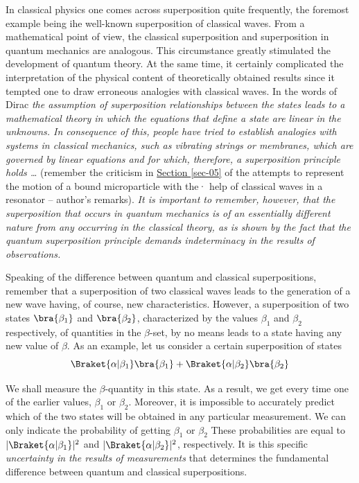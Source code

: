 \documentclass[a4paper,sfsidenotes,colorlinks=true]{tufte-book}
\numberwithin{equation}{section}
\numberwithin{figure}{section}
\begin{document}
  In  classical physics one comes across superposition quite
  frequently, the foremost example being ihe well-known superposition
  of classical waves. From a mathematical point of view, the classical
  superposition and superposition in quantum mechanics are
  analogous. This circumstance greatly stimulated the development of
  quantum theory. At the same time, it certainly complicated the
  interpretation of the physical content of theoretically obtained
  results since it tempted one to draw erroneous analogies with
  classical waves. In the words of Dirac \cite{dirac-1958} \emph{the assumption of
  superposition relationships between the states leads to a
  mathematical theory in which the equations that define a state are
  linear in the unknowns. In consequence of this, people have tried
  to establish analogies with systems in classical mechanics, such as
  vibrating strings or membranes, which are governed by linear
  equations and for which, therefore, a superposition principle
  holds \ldots} (remember the criticism in \hyperref[sec-05]{Section \ref{sec-05}} of the attempts to represent the motion of a bound microparticle with the· help of
  classical waves in a resonator -- author's remarks). \emph{It is important to
  remember, however, that the superposition that occurs in quantum
  mechanics is of an essentially different nature from any occurring
  in the classical theory, as is shown by the fact that the quantum
  superposition principle demands indeterminacy in the results of
  observations.}

Speaking of the difference between quantum and classical
superpositions, remember that a superposition of two classical waves
leads to the generation of a new wave having, of course, new
characteristics. However, a superposition of two states
$\bra{\beta_{1}}$ and  $\bra{\beta_{2}}$, characterized by the values $\beta_{1}$ and $\beta_{2}$ respectively, of quantities in the $\beta$-set, by no means leads to a state having any new value of $\beta$. As an example, let us consider a certain superposition of states 
\begin{equation*}
\Braket{\alpha | \beta_{1}} \bra{\beta_{1}} + \Braket{\alpha | \beta_{2}} \bra{\beta_{2}} 
\end{equation*}

We shall measure the $\beta$-quantity in this state. As a result, we
get every time one of the earlier values, $\beta_{1}$ or
$\beta_{2}$. Moreover, it is impossible to accurately predict which of
the two states will be obtained in any particular measurement. We can
only indicate the probability of getting $\beta_{1}$ or $\beta_{2}$
These probabilities are equal to $|\Braket{\alpha | \beta_{1}}|^{2}$
and $|\Braket{\alpha | \beta_{2}}|^{2}$, respectively. It is this
specific \emph{uncertainty in the results of measurements} that
determines the fundamental difference between quantum and classical
superpositions.
\end{document}
